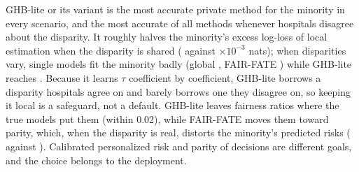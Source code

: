 GHB-lite or its variant is the most accurate private method for the minority in every scenario, and the most accurate of all methods whenever hospitals disagree about the disparity. It roughly halves the minority's excess log-loss of local estimation when the disparity is shared (\SimEighteenSharedGHBMin{} against \SimEighteenSharedLocalMin{} $\times10^{-3}$ nats); when disparities vary, single models fit the minority badly (global \SimEighteenVariesGlobalMin, FAIR-FATE \SimEighteenVariesFFEQOMin) while GHB-lite reaches \SimEighteenVariesGHBMin. Because it learns $\tau$ coefficient by coefficient, GHB-lite borrows a disparity hospitals agree on and barely borrows one they disagree on, so keeping it local is a safeguard, not a default. GHB-lite leaves fairness ratios where the true models put them (within 0.02), while FAIR-FATE moves them toward parity, which, when the disparity is real, distorts the minority's predicted risks (\SimEighteenSharedFFEQOMin{} against \SimEighteenSharedGHBMin). Calibrated personalized risk and parity of decisions are different goals, and the choice belongs to the deployment.


